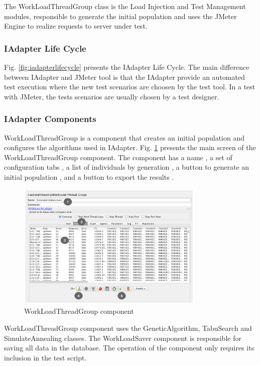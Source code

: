 The WorkLoadThreadGroup class is the Load Injection and Test Management modules, responsible to generate the initial population and uses the JMeter Engine to realize requests to server under test. 

\subsubsection{IAdapter Life Cycle}
 
Fig. \ref{fig:iadapterlifecycle} presents the IAdapter Life Cycle. The main difference between IAdapter and JMeter tool is that the IAdapter provide an automated test execution where the new test scenarios are choosen by the test tool.  In a test with JMeter, the tests scenarios are usually chosen by a test designer.



\subsubsection{IAdapter Components}
 
WorkLoadThreadGroup is a component that creates an initial population and configures the algorithms used in IAdapter. Fig. \ref{fig:tela1iadapter} presents the main screen of the WorkLoadThreadGroup component. The component has a name , a set of configuration tabs , a list of individuals by generation , a button to generate an initial population , and a button to export the results .

\begin{figure}[h]
\centering
\includegraphics[width=0.8\textwidth]{./images/tela1iadapter.png}
\caption{WorkLoadThreadGroup component}
\label{fig:tela1iadapter}
\end{figure}

WorkLoadThreadGroup component uses the GeneticAlgorithm, TabuSearch and SimulateAnnealing classes.  The WorkLoadSaver component is responsible for saving all data in the database. The operation of the component only requires its inclusion in the test script.

